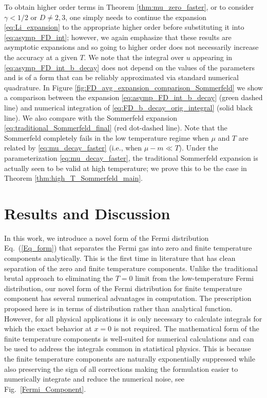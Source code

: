 \documentclass[sn-mathphys,Numbered]{sn-jnl}
\begin{document}
To obtain higher order terms in  Theorem \ref{thm:mu_zero_faster}, or to consider  $\gamma<1/2$ or $D\neq 2,3$, one simply needs to  continue the expansion \eqref{eq:Li_expansion} to the appropriate higher order before substituting it into \eqref{eq:asymp_FD_int}; however, we again emphasize that these results are asymptotic expansions and so going to higher order does not necessarily increase the accuracy at a given $T$. We note that the integral over $u$ appearing in \eqref{eq:asymp_FD_int_b_decay} does not depend on the values of the parameters and is of a form that can be  reliably approximated via standard numerical quadrature.  In Figure \ref{fig:FD_avg_expansion_comparison_Sommerfeld} we show a comparison between the expansion \eqref{eq:asymp_FD_int_b_decay} (green dashed line) and numerical integration of \eqref{eq:FD_b_decay_orig_integral} (solid black line).  We also compare with the Sommerfeld expansion \eqref{eq:traditional_Sommerfeld_final} (red dot-dashed line).  Note that the Sommerfeld completely fails in the low temperature regime when $\mu$ and $T$ are related by \eqref{eq:mu_decay_faster} (i.e., when $\mu-m\ll T$).  Under the parameterization \eqref{eq:mu_decay_faster}, the traditional Sommerfeld expansion is actually seen to be valid at high temperature; we prove this to be the case in Theorem \ref{thm:high_T_Sommerfeld_main}.






\section{Results and Discussion}
\label{sec12}
In this work, we introduce a novel form of the Fermi distribution Eq.~(\ref{Eq_form}) that separates the Fermi gas into zero and finite temperature components analytically. This is the first time in literature that has clean separation of the zero and finite temperature components. Unlike the traditional brutal approach to eliminating the $T=0$ limit from the low-temperature Fermi distribution, our novel form of the Fermi distribution for finite temperature component has several numerical advantages in computation. The prescription proposed here is in terms of distribution rather than analytical function. However, for all physical applications it is only necessary to calculate integrals for which the exact behavior at $x=0$ is not required. 
The mathematical form of the finite temperature components is well-suited for numerical calculations and can be used to address the integrals common in statistical physics. This is because the finite temperature components are naturally exponentially suppressed while also preserving the sign of all corrections making the formulation easier to numerically integrate and reduce the numerical noise, see Fig.~\ref{Fermi_Component}. 
\end{document}
